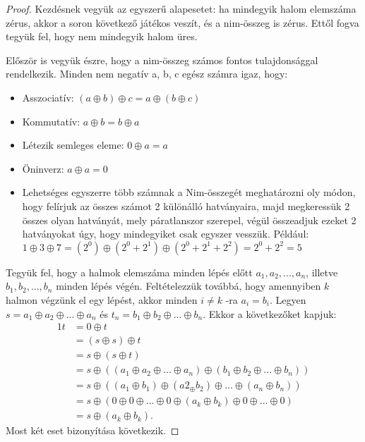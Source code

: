 \begin{proof}
Kezdésnek vegyük az egyszerű alapesetet: ha mindegyik halom elemszáma zérus, akkor a soron következő játékos veszít, és a nim-összeg is zérus. Ettől fogva tegyük fel, hogy nem mindegyik halom üres. \ujsor

Először is vegyük észre, hogy a nim-összeg számos fontos tulajdonsággal rendelkezik. Minden nem negatív a, b, c egész számra igaz, hogy:
\begin{itemize}
	\item Asszociatív: $(a \oplus b) \oplus c = a \oplus (b \oplus c)$
	\item Kommutatív: $a \oplus b = b \oplus a$
	\item Létezik semleges eleme: $0 \oplus a = a$
	\item Öninverz: $a \oplus a = 0$
	\item Lehetséges egyszerre több számnak a Nim-összegét meghatározni oly módon, hogy felírjuk az összes számot 2 különálló hatványaira, majd megkeressük 2 összes olyan hatványát, mely páratlanszor szerepel, végül összeadjuk ezeket 2 hatványokat úgy, hogy mindegyiket csak egyszer vesszük. Például: \ujsor
	$1 \oplus 3 \oplus 7 = (2^0) \oplus (2^0 + 2^1) \oplus (2^0 + 2^1 + 2^2) = 2^0 + 2^2 = 5$
\end{itemize}

Tegyük fel, hogy a halmok elemszáma minden lépés előtt $a_1, a_2, ..., a_n$, illetve \\ $b_1, b_2, ..., b_n$ minden lépés végén. Feltételezzük továbbá, hogy amennyiben $k$ halmon végzünk el egy lépést, akkor minden $i \neq k$ -ra $a_i = b_i$. Legyen $s = a_1 \oplus a_2 \oplus ... \oplus a_n$ és $t_n = b_1 \oplus b_2 \oplus ... \oplus b_n$. Ekkor a következőket kapjuk:
\begin{alignat*}{1}
	t &= 0 \oplus t \\
	&= (s \oplus s) \oplus t \\
	&= s \oplus (s \oplus t) \\
	&= s \oplus ((a_1 \oplus a_2 \oplus ... \oplus a_n) \oplus (b_1 \oplus b_2 \oplus ... \oplus b_n)) \\
	&= s \oplus ((a_1 \oplus b_1) \oplus (a2_ \oplus b_2) \oplus ... \oplus (a_n \oplus b_n)) \\
	&= s \oplus (0 \oplus 0 \oplus ... \oplus 0 \oplus (a_k \oplus b_k) \oplus 0 \oplus ... \oplus 0) \\
	&= s \oplus (a_k \oplus b_k).
\end{alignat*}
Most két eset bizonyítása következik. \ujsor


\end{proof}
